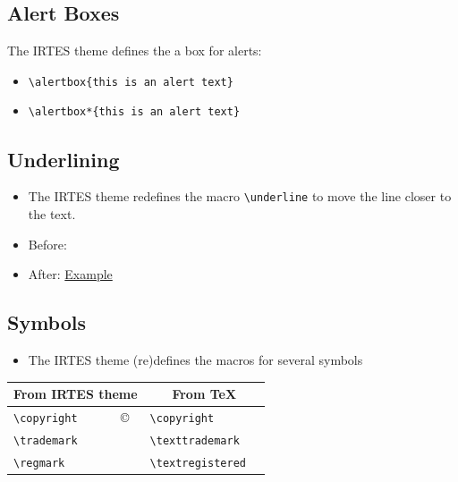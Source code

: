 \documentclass[english,circlenumberstyle]{irtesbeamer}
\begin{document}
\subsection{Alert Boxes}
\begin{frame}{\subsecname}
	The IRTES theme defines the a box for alerts: \\
	\begin{itemize}
	\item \texttt{{\textbackslash}alertbox\{this is an alert text\}} \\[.5cm]
		\vspace{1cm}
	\item \texttt{{\textbackslash}alertbox*\{this is an alert text\}} \\[.5cm]
	\end{itemize}
\end{frame}

\subsection{Underlining}

\makeatletter
\begin{frame}{\subsecname}
	\begin{itemize}
	\item The IRTES theme redefines the macro \texttt{{\textbackslash}underline} to move the line closer to the text.
	\item Before: 
	\item After: \underline{Example}
	\end{itemize}
\end{frame}
\makeatother

\subsection{Symbols}
\begin{frame}{\subsecname}
	\begin{itemize}
	\item The IRTES theme (re)defines the macros for several symbols
	\end{itemize}
	\begin{tabularx}{\linewidth}{|l|X|l|X|}
	\hline
	\multicolumn{2}{|c|}{\textbf{From IRTES theme}} & \multicolumn{2}{c|}{\textbf{From \TeX}} \\
	\hline
	\texttt{{\textbackslash}copyright} & \copyright & \texttt{{\textbackslash}copyright} & \textcopyright \\
	\hline
	\texttt{{\textbackslash}trademark} & \trademark & \texttt{{\textbackslash}texttrademark} & \texttrademark \\
	\hline
	\texttt{{\textbackslash}regmark} & \regmark & \texttt{{\textbackslash}textregistered} & \textregistered \\
	\hline
	\end{tabularx}
\end{frame}
\end{document}
